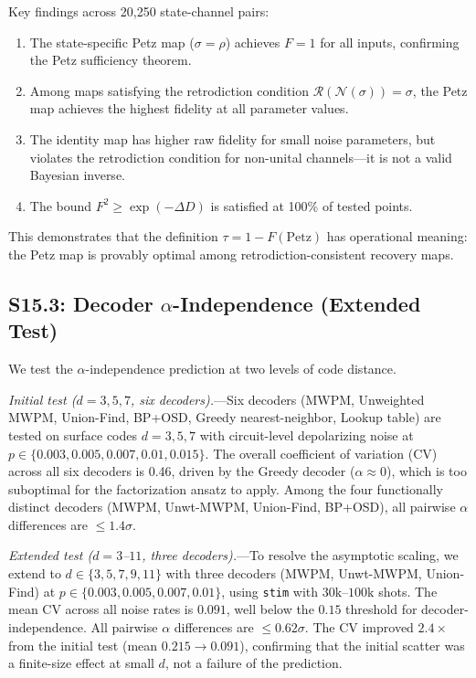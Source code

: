 \documentclass[prl,twocolumn,superscriptaddress,longbibliography]{revtex4-2}
\newcommand{\chan}{\mathcal{N}}
\newcommand{\tauasym}{\tau}
\begin{document}
Key findings across 20,250 state-channel pairs:
\begin{enumerate}
\item The state-specific Petz map ($\sigma = \rho$) achieves $F = 1$
  for all inputs, confirming the Petz sufficiency theorem.
\item Among maps satisfying the retrodiction condition
  $\mathcal{R}(\chan(\sigma)) = \sigma$, the Petz map achieves the
  highest fidelity at all parameter values.
\item The identity map has higher raw fidelity for small noise
  parameters, but violates the retrodiction condition for non-unital
  channels---it is not a valid Bayesian inverse.
\item The bound $F^2 \geq \exp(-\Delta D)$ is satisfied at 100\% of
  tested points.
\end{enumerate}

This demonstrates that the definition $\tauasym = 1 - F(\text{Petz})$
has operational meaning: the Petz map is provably optimal among
retrodiction-consistent recovery maps.

\subsection{S15.3: Decoder $\alpha$-Independence (Extended Test)}

We test the $\alpha$-independence prediction at two levels of
code distance.

\emph{Initial test ($d = 3, 5, 7$, six decoders).}---Six decoders
(MWPM, Unweighted MWPM, Union-Find, BP+OSD, Greedy nearest-neighbor,
Lookup table) are tested on surface codes $d = 3, 5, 7$ with
circuit-level depolarizing noise at
$p \in \{0.003, 0.005, 0.007, 0.01, 0.015\}$. The overall
coefficient of variation (CV) across all six decoders is 0.46,
driven by the Greedy decoder ($\alpha \approx 0$), which is too
suboptimal for the factorization ansatz to apply. Among the four
functionally distinct decoders (MWPM, Unwt-MWPM, Union-Find,
BP+OSD), all pairwise $\alpha$ differences are $\leq 1.4\sigma$.

\emph{Extended test ($d = 3$--$11$, three decoders).}---To resolve
the asymptotic scaling, we extend to $d \in \{3, 5, 7, 9, 11\}$
with three decoders (MWPM, Unwt-MWPM, Union-Find) at
$p \in \{0.003, 0.005, 0.007, 0.01\}$, using \texttt{stim} with
$30\text{k}$--$100\text{k}$ shots. The mean CV across all noise
rates is $0.091$, well below the $0.15$ threshold for
decoder-independence. All pairwise $\alpha$ differences are
$\leq 0.62\sigma$. The CV improved $2.4\times$ from the initial
test (mean $0.215 \to 0.091$), confirming that the initial
scatter was a finite-size effect at small $d$, not a failure of the
prediction.
\end{document}
